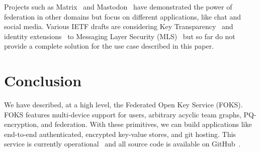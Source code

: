 \documentclass[11pt]{article}
\begin{document}
Projects such as Matrix~\cite{matrix} and Mastodon~\cite{mastadon} have
demonstrated the power of federation in other domains but focus on different
applications, like chat and social media. Various IETF drafts are considering
Key Transparency~\cite{ietf-keytrans-architecture-03} and identity
extensions~\cite{barnes-mimi-identity-arch-02} to Messaging Layer Security
(MLS)~\cite{rfc9420} but so far do not provide a complete solution for the use
case described in this paper.

\section{Conclusion}

We have described, at a high level, the Federated Open Key Service (FOKS).
FOKS features multi-device support for users, arbitrary acyclic team graphs,
PQ-encryption, and federation. With these primitives, we can build applications
like end-to-end authenticated, encrypted key-value stores, and git hosting.
This service is currently operational~\cite{foks-app} and all 
source code is available on GitHub~\cite{foks-github}.



\end{document}
